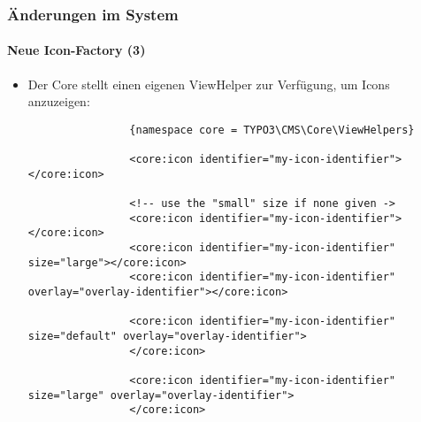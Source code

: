 \begin{frame}[fragile]
	\frametitle{Änderungen im System}
	\framesubtitle{Neue Icon-Factory (3)}

	\lstset{basicstyle=\tiny\ttfamily}

	\begin{itemize}

		\item Der Core stellt einen eigenen ViewHelper zur Verfügung, um Icons anzuzeigen:

			\begin{lstlisting}
				{namespace core = TYPO3\CMS\Core\ViewHelpers}

				<core:icon identifier="my-icon-identifier"></core:icon>

				<!-- use the "small" size if none given ->
				<core:icon identifier="my-icon-identifier"></core:icon>
				<core:icon identifier="my-icon-identifier" size="large"></core:icon>
				<core:icon identifier="my-icon-identifier" overlay="overlay-identifier"></core:icon>

				<core:icon identifier="my-icon-identifier" size="default" overlay="overlay-identifier">
				</core:icon>

				<core:icon identifier="my-icon-identifier" size="large" overlay="overlay-identifier">
				</core:icon>
			\end{lstlisting}

	\end{itemize}

\end{frame}

